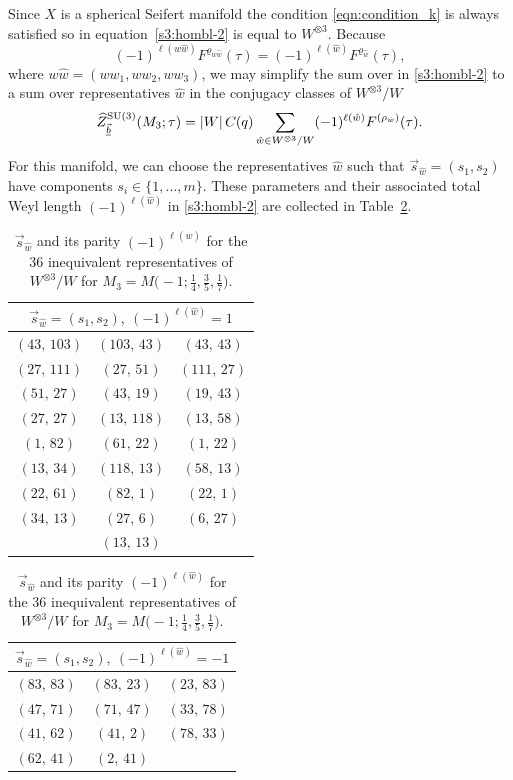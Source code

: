 \documentclass[10pt,a4paper]{amsart}
\theoremstyle{definition}
\numberwithin{equation}{section}
\begin{document}
Since $X$ is a spherical Seifert manifold the condition \eqref{eqn:condition_k} is always satisfied so  in equation~\eqref{s3:hombl-2} is equal to $W^{\otimes 3}$. Because
\[
 (-1)^{\ell(w\hat w)}F^{\varrho_{w\hat w}}(\tau)=(-1)^{\ell(\hat w)}F^{\varrho_{\hat w}}(\tau),
\]
where $w\hat{w}=(ww_1,ww_2,ww_3)$, we may simplify the sum over  in \eqref{s3:hombl-2} to a sum over representatives $\hat{w}$ in the conjugacy classes of $W^{\otimes 3}/W$
\[%
\widehat{Z}^{{\rm SU}(3)}_{\vec{\underline{b}}}(M_3;\tau) =
\left|W\right|C_{}(q)
\sum_{\hat{w}\in W^{\otimes 3}/W }
(-1)^{\ell (\hat{w})}
F^{(\rho_{\hat w})} (\tau).
\]
For this manifold, we can choose the representatives $\hat{w}$ such that $\vec s_{\hat w} =(s_1,s_2)$ have components $s_{i} \in \{1,\dots , m\}$. These parameters and their associated total Weyl length $(-1)^{\ell({\hat{w}})}$ in \eqref{s3:hombl-2} are collected in Table~\ref{tab:s-brieskorn}.

\begin{table}\renewcommand{\arraystretch}{1.2}
 \centering
 \begin{minipage}{65mm}
 \begin{tabular}{ccc}
 \multicolumn{3}{c}{$\vec s_{\hat w} =( s_{1},s_{2} ),\ (-1)^{\ell(\hat{w})}=1$} \\\hline
 $(43,\,103)$ & $(103,\,43)$ & $(43,\,43)$ \\
 $(27,\,111)$ & $(27,\,51)$ & $(111,\,27)$ \\
 $(51,\,27)$ & $(43,\,19)$ & $(19,\,43)$ \\
 $(27,\,27)$ & $(13,\,118)$ & $(13,\,58)$ \\
 $(1,\,82)$ & $(61,\,22)$ & $(1,\,22)$ \\
 $(13,\,34)$ & $(118,\,13)$ & $(58,\,13)$ \\
 $(22,\,61)$ & $(82,\,1)$ & $(22,\,1)$ \\
 $(34,\,13)$ & $(27,\,6)$ & $(6,\,27)$ \\
 &$(13,\,13)$ &
 \end{tabular}
 \end{minipage}\qquad
 \begin{minipage}{55mm}
 \begin{tabular}{ccc}
 \multicolumn{3}{c}{$\vec s_{\hat w} =( s_{1},s_{2} ),\ (-1)^{\ell(\hat{w})}=-1$} \\\hline
 $(83,\,83)$ & $(83,\,23)$ & $(23,\,83)$ \\
 $(47,\,71)$ & $(71,\,47)$ & $(33,\,78)$ \\
 $(41,\,62)$ & $(41,\,2)$ & $(78,\,33)$ \\
 $(62,\,41)$ & $(2,\,41)$ \\
 \end{tabular}
 \vspace{2.75cm}
 \end{minipage}

\caption{$\vec s_{\hat w}$ and its parity $(-1)^{\ell(\hat{w})}$ for the 36 inequivalent representatives of $W^{\otimes 3}/W$ for $M_3=M\bigl(-1;\frac{1}{4},\frac{3}{5},\frac{1}{7}\bigr)$.}\label{tab:s-brieskorn}
\end{table}
\end{document}
